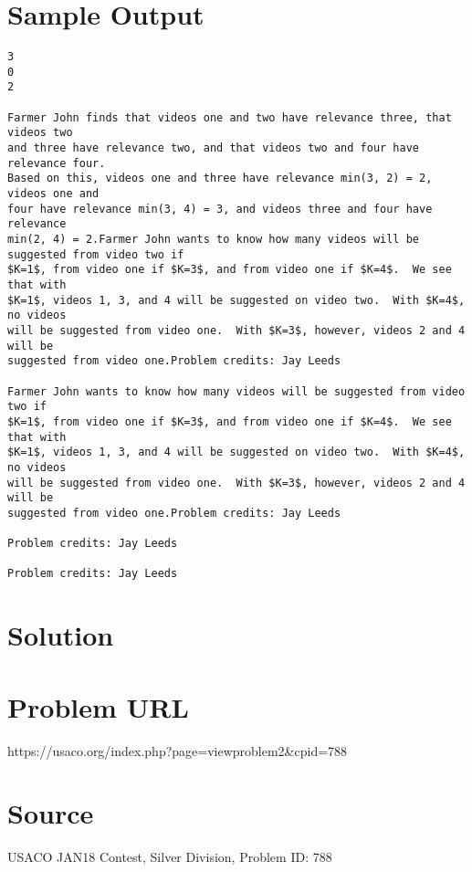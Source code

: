 \documentclass[12pt]{article}
\begin{document}
\section*{Sample Output}
\begin{verbatim}
3
0
2

Farmer John finds that videos one and two have relevance three, that videos two
and three have relevance two, and that videos two and four have relevance four. 
Based on this, videos one and three have relevance min(3, 2) = 2, videos one and
four have relevance min(3, 4) = 3, and videos three and four have relevance
min(2, 4) = 2.Farmer John wants to know how many videos will be suggested from video two if
$K=1$, from video one if $K=3$, and from video one if $K=4$.  We see that with
$K=1$, videos 1, 3, and 4 will be suggested on video two.  With $K=4$, no videos
will be suggested from video one.  With $K=3$, however, videos 2 and 4 will be
suggested from video one.Problem credits: Jay Leeds

Farmer John wants to know how many videos will be suggested from video two if
$K=1$, from video one if $K=3$, and from video one if $K=4$.  We see that with
$K=1$, videos 1, 3, and 4 will be suggested on video two.  With $K=4$, no videos
will be suggested from video one.  With $K=3$, however, videos 2 and 4 will be
suggested from video one.Problem credits: Jay Leeds

Problem credits: Jay Leeds

Problem credits: Jay Leeds
\end{verbatim}

\section*{Solution}


\section*{Problem URL}
https://usaco.org/index.php?page=viewproblem2&cpid=788

\section*{Source}
USACO JAN18 Contest, Silver Division, Problem ID: 788
\end{document}
